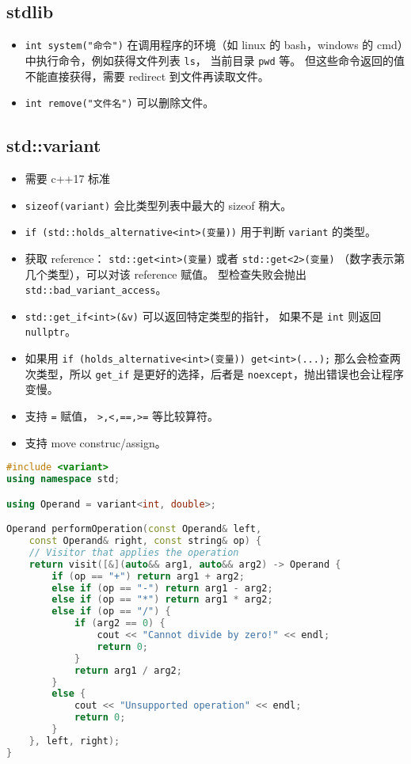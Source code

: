 \subsection{stdlib}
\begin{itemize}
\item \verb`int system("命令")` 在调用程序的环境（如 linux 的 bash，windows 的 cmd）中执行命令，例如获得文件列表 \verb`ls`， 当前目录 \verb`pwd` 等。 但这些命令返回的值不能直接获得，需要 redirect 到文件再读取文件。
\item \verb`int remove("文件名")` 可以删除文件。
\end{itemize}

\subsection{std::variant}
\begin{itemize}
\item 需要 c++17 标准
\item \verb|sizeof(variant)| 会比类型列表中最大的 sizeof 稍大。
\item \verb|if (std::holds_alternative<int>(变量))| 用于判断 \verb|variant| 的类型。
\item 获取 reference： \verb|std::get<int>(变量)| 或者 \verb|std::get<2>(变量)| （数字表示第几个类型），可以对该 reference 赋值。 型检查失败会抛出 \verb|std::bad_variant_access|。
\item \verb|std::get_if<int>(&v)| 可以返回特定类型的指针， 如果不是 \verb|int| 则返回 \verb|nullptr|。
\item 如果用 \verb|if (holds_alternative<int>(变量)) get<int>(...);| 那么会检查两次类型，所以 \verb|get_if| 是更好的选择，后者是 \verb|noexcept|，抛出错误也会让程序变慢。
\item 支持 \verb|=| 赋值， \verb|>,<,==,>=| 等比较算符。
\item 支持 move construc/assign。
\end{itemize}
\begin{lstlisting}[language=cpp]
#include <variant>
using namespace std;

using Operand = variant<int, double>;

Operand performOperation(const Operand& left,
    const Operand& right, const string& op) {
    // Visitor that applies the operation
    return visit([&](auto&& arg1, auto&& arg2) -> Operand {
        if (op == "+") return arg1 + arg2;
        else if (op == "-") return arg1 - arg2;
        else if (op == "*") return arg1 * arg2;
        else if (op == "/") {
            if (arg2 == 0) {
                cout << "Cannot divide by zero!" << endl;
                return 0;
            }
            return arg1 / arg2;
        }
        else {
            cout << "Unsupported operation" << endl;
            return 0;
        }
    }, left, right);
}
\end{lstlisting}
